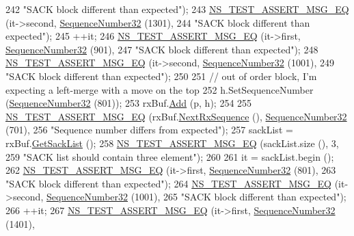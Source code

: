 \begin{DoxyCode}
242                          \textcolor{stringliteral}{"SACK block different than expected"});
243   \hyperlink{group__testing_ga2a9d78cffb3db8e867c35fff0b698cf5}{NS\_TEST\_ASSERT\_MSG\_EQ} (it->second, \hyperlink{classns3_1_1SequenceNumber}{SequenceNumber32} (1301),
244                          \textcolor{stringliteral}{"SACK block different than expected"});
245   ++it;
246   \hyperlink{group__testing_ga2a9d78cffb3db8e867c35fff0b698cf5}{NS\_TEST\_ASSERT\_MSG\_EQ} (it->first, \hyperlink{classns3_1_1SequenceNumber}{SequenceNumber32} (901),
247                          \textcolor{stringliteral}{"SACK block different than expected"});
248   \hyperlink{group__testing_ga2a9d78cffb3db8e867c35fff0b698cf5}{NS\_TEST\_ASSERT\_MSG\_EQ} (it->second, \hyperlink{classns3_1_1SequenceNumber}{SequenceNumber32} (1001),
249                          \textcolor{stringliteral}{"SACK block different than expected"});
250 
251   \textcolor{comment}{// out of order block, I'm expecting a left-merge with a move on the top}
252   h.SetSequenceNumber (\hyperlink{classns3_1_1SequenceNumber}{SequenceNumber32} (801));
253   rxBuf.\hyperlink{classns3_1_1TcpRxBuffer_a35a036383b8976cb79738c28aa01d5d0}{Add} (p, h);
254 
255   \hyperlink{group__testing_ga2a9d78cffb3db8e867c35fff0b698cf5}{NS\_TEST\_ASSERT\_MSG\_EQ} (rxBuf.\hyperlink{classns3_1_1TcpRxBuffer_ae994bf90329d10f17b59d32907b04ca9}{NextRxSequence} (), 
      \hyperlink{group__network_gacb2070e4e98d2d5135c9bede58f07a03}{SequenceNumber32} (701),
256                          \textcolor{stringliteral}{"Sequence number differs from expected"});
257   sackList = rxBuf.\hyperlink{classns3_1_1TcpRxBuffer_afc5d672da4595330754de1bb3933a9c7}{GetSackList} ();
258   \hyperlink{group__testing_ga2a9d78cffb3db8e867c35fff0b698cf5}{NS\_TEST\_ASSERT\_MSG\_EQ} (sackList.size (), 3,
259                          \textcolor{stringliteral}{"SACK list should contain three element"});
260 
261   it = sackList.begin ();
262   \hyperlink{group__testing_ga2a9d78cffb3db8e867c35fff0b698cf5}{NS\_TEST\_ASSERT\_MSG\_EQ} (it->first, \hyperlink{classns3_1_1SequenceNumber}{SequenceNumber32} (801),
263                          \textcolor{stringliteral}{"SACK block different than expected"});
264   \hyperlink{group__testing_ga2a9d78cffb3db8e867c35fff0b698cf5}{NS\_TEST\_ASSERT\_MSG\_EQ} (it->second, \hyperlink{classns3_1_1SequenceNumber}{SequenceNumber32} (1001),
265                          \textcolor{stringliteral}{"SACK block different than expected"});
266   ++it;
267   \hyperlink{group__testing_ga2a9d78cffb3db8e867c35fff0b698cf5}{NS\_TEST\_ASSERT\_MSG\_EQ} (it->first, \hyperlink{classns3_1_1SequenceNumber}{SequenceNumber32} (1401),

\end{DoxyCode}
